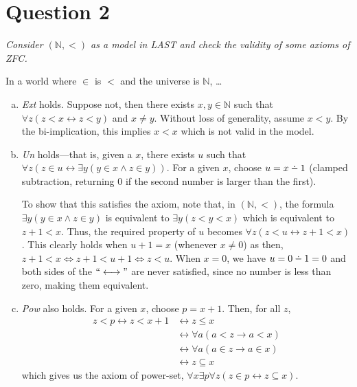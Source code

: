 \documentclass[a4paper]{article}
\def\dotminus{\mathbin{\ooalign{\hss\raise1ex\hbox{.}\hss\cr
  \mathsurround=0pt$-$}}}
\begin{document}
\section*{Question 2}
\begin{center}
  \textit{Consider $(\mathbb N, <)$
  as a model in LAST and check the validity of some axioms of ZFC.}
\end{center}
In a world where $\in$ is $<$ and the universe is $\mathbb N$, \ldots
\begin{enumerate}[a)]
  \item \textit{Ext} holds. Suppose not, then there exists $x,y \in \mathbb N$
    such that $\forall z(z < x \longleftrightarrow z < y)$
    and $x \ne y$. Without loss of generality, assume $x < y$.
    By the bi-implication, this implies $x < x$ which is not valid in the model.
  \item \textit{Un} holds---that is, given a $x$, there exists $u$ such that
    $\forall z(z \in u \longleftrightarrow \exists y(y \in x \wedge z \in y))$.
    For a given $x$, choose $u = x \dotminus 1$ (clamped subtraction, returning 0 if the second number is larger than the first).

    To show that this satisfies the axiom, note that,
    in $(\mathbb N,<)$,
    the formula
    $\exists y (y \in x \wedge z \in y)$ is equivalent to $\exists y(z < y < x)$
    which is equivalent to $z + 1 < x$.
    Thus, the required property of $u$ becomes
    $\forall z(z < u \longleftrightarrow z + 1 < x)$.
    This clearly holds when $u + 1 = x$ (whenever $x \ne 0$) as then,
    $z+1 < x \iff z + 1 < u + 1 \iff z < u$.
    When $x = 0$, we have $u = 0 \dotminus 1 = 0$
    and both sides of the $``\longleftrightarrow"$
    are never satisfied, 
    since no number is less than zero, making them equivalent.

  \item \textit{Pow} also holds.
    For a given $x$, choose $p = x + 1$.
    Then, for all $z$,
    \begin{align*}
      z < p \longleftrightarrow z < x + 1 &\longleftrightarrow z \le x \\
            &\longleftrightarrow \forall a(a < z \longrightarrow a < x) \\
            &\longleftrightarrow \forall a(a \in z \longrightarrow a \in x) \\
            &\longleftrightarrow z \subseteq x
    \end{align*}
    which gives us the axiom of power-set,
    $\forall x\exists p\forall z(z \in p \longleftrightarrow z \subseteq x)$.



\end{enumerate}
\end{document}
